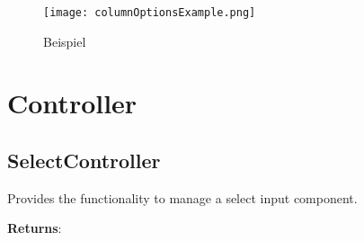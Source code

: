 \begin{figure}[!htb]
    \centering
    \texttt{[image: columnOptionsExample.png]}
    \caption*{\centering Beispiel }
    \label{api:columnOptionsComponentImg}
\end{figure}


\clearpage
\section*{Controller}

\vspace*{6pt}
\subsection*{SelectController}

\vspace*{6pt}
Provides the functionality to manage a select input component. 

\vspace*{18pt}
\noindent
\textbf{Returns}: 


